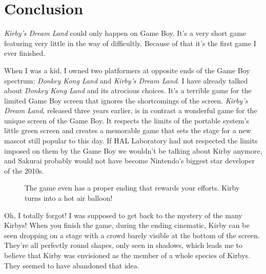 \documentclass{book}
\begin{document}
\FloatBarrier\section*{Conclusion}
\emph{Kirby’s Dream Land} could only happen on Game Boy. It’s a very short game featuring very little in the way of difficultly. Because of that it’s the first game I ever finished.\par
When I was a kid, I owned two platformers at opposite ends of the Game Boy spectrum: \emph{Donkey Kong Land} and \emph{Kirby’s Dream Land}. I have already talked about \emph{Donkey Kong Land} and its atrocious choices. It’s a terrible game for the limited Game Boy screen that ignores the shortcomings of the screen. \emph{Kirby’s Dream Land}, released three years earlier, is in contrast a wonderful game for the unique screen of the Game Boy. It respects the limits of the portable system’s little green screen and creates a memorable game that sets the stage for a new mascot still popular to this day. If HAL Laboratory had not respected the limits imposed on them by the Game Boy we wouldn’t be talking about Kirby anymore, and Sakurai probably would not have become Nintendo’s biggest star developer of the 2010s.\par
\FloatBarrier\vspace{\baselineskip}\begin{figure}[H]\caption*{The game even has a proper ending that rewards your efforts. Kirby turns into a hot air balloon!}\end{figure}
Oh, I totally forgot! I was supposed to get back to the mystery of the many Kirbys! When you finish the game, during the ending cinematic, Kirby can be seen dropping on a stage with a crowd barely visible at the bottom of the screen. They’re all perfectly round shapes, only seen in shadows, which leads me to believe that Kirby was envisioned as the member of a whole species of Kirbys. They seemed to have abandoned that idea.\par
\endgroup 
\end{document}
